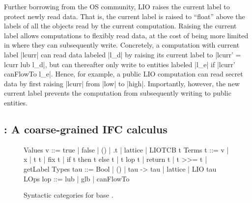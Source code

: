 
Further borrowing from the OS community, LIO raises the current label
to protect newly read data.
%
That is, the current label is raised to ``float'' above the labels of
all the objects read by the current computation.
% 
Raising the current label allows computations to flexibly read data,
at the cost of being more limited in where they can subsequently
write.
%
Concretely, a computation with current label |lcurr| can read data
labeled |l_d| by raising its current label to |lcurr' = lcurr lub
l_d|, but can thereafter only write to entities labeled |l_e| if
|lcurr' canFlowTo l_e|.
%
Hence, for example, a public LIO computation can read secret data by
first raising |lcurr| from |low| to |high|. Importantly, however, the
new current label prevents the computation from subsequently writing
to public entities.


\subsection{\lio: A coarse-grained IFC calculus}
 

\begin{figure}[t]
\small
\centering
\begin{code}
Values  v    ::=  true | false | () | \x.t | lattice | LIOTCB t
Terms   t    ::=  v | x | t t | fix t | if t then t else t
               |  t lop t | return t | t >>= t | getLabel
Types   tau  ::=  Bool | () | tau -> tau | lattice | LIO tau  
LOps    lop  ::=  lub | glb | canFlowTo
\end{code}
\caption{\label{fig:sos:base} Syntactic categories for base \lio.}
\end{figure}

